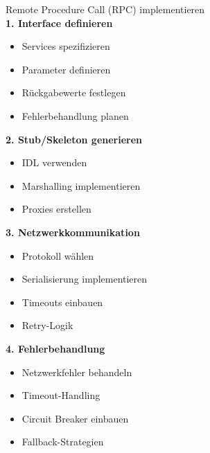 \begin{KR}{Remote Procedure Call (RPC) implementieren}\\
\textbf{1. Interface definieren}
\begin{itemize}
    \item Services spezifizieren
    \item Parameter definieren
    \item Rückgabewerte festlegen
    \item Fehlerbehandlung planen
\end{itemize}

\textbf{2. Stub/Skeleton generieren}
\begin{itemize}
    \item IDL verwenden
    \item Marshalling implementieren
    \item Proxies erstellen
\end{itemize}

\textbf{3. Netzwerkkommunikation}
\begin{itemize}
    \item Protokoll wählen
    \item Serialisierung implementieren
    \item Timeouts einbauen
    \item Retry-Logik
\end{itemize}

\textbf{4. Fehlerbehandlung}
\begin{itemize}
    \item Netzwerkfehler behandeln
    \item Timeout-Handling
    \item Circuit Breaker einbauen
    \item Fallback-Strategien
\end{itemize}
\end{KR}


